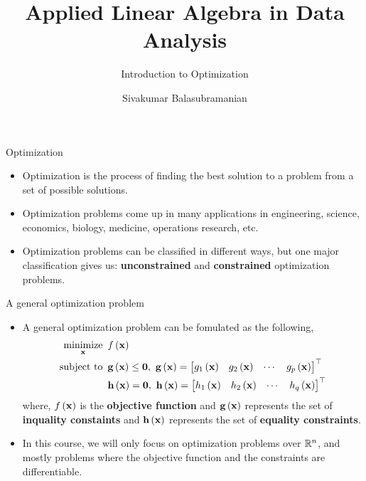 \documentclass[aspectratio=169]{beamer}
\title{Applied Linear Algebra in Data Analysis}
\subtitle{Introduction to Optimization}
\author{Sivakumar Balasubramanian}
\institute[Christian Medical College] %
{
  \inst{}%
  Department of Bioengineering\\
  Christian Medical College, Bagayam\\
  Vellore 632002
}
\date{}
\let\olditem\item
\renewcommand{\item}{\setlength{\itemsep}{\fill}\olditem}
\def\mf{\ensuremath\mathbf}
\def\mb{\ensuremath\mathbb}
\def\lp{\ensuremath\left(}
\def\rp{\ensuremath\right)}
\def\bmx{\ensuremath\begin{bmatrix*}[r]}
\def\emx{\ensuremath\end{bmatrix*}}
\def\R{\ensuremath\mb{R}}
\newcommand{\ct}[1]{\lp #1\rp}
\begin{document}


\begin{frame}
  \titlepage
\end{frame}


\begin{frame}[t]{Optimization}
\begin{itemize}
  \item Optimization is the process of finding the best solution to a problem from a set of possible solutions.
  \item Optimization problems come up in many applications in engineering, science, economics, biology, medicine, operations research, etc.
  \item Optimization problems can be classified in different ways, but one major classification gives us: \textbf{unconstrained} and \textbf{constrained} optimization problems.
\end{itemize}
\end{frame}


\begin{frame}[t]{A general optimization problem}
\begin{itemize}
  \item A general optimization problem can be fomulated as the following,
  \[ \begin{split}
      \underset{\mf{x}}{\text{minimize}} 
      & \,\,\, f\ct{\mf{x}} \\
      \mathrm{subject \,\, to} & \,\,\, \mf{g}\ct{\mf{x}} \leq \mf{0}, \,\, \mf{g}\ct{\mf{x}} = \bmx g_1\ct{\mf{x}} & g_2\ct{\mf{x}} & \cdots & g_p\ct{\mf{x}}\emx^\top \\
      & \,\,\, \mf{h}\ct{\mf{x}} = \mf{0}, \,\, \mf{h}\ct{\mf{x}} = \bmx h_1\ct{\mf{x}} & h_2\ct{\mf{x}} & \cdots & h_q\ct{\mf{x}}\emx^\top \\
  \end{split} \]
  where, $f\ct{\mf{x}}$ is the \textbf{objective function} and $\mf{g}\ct{\mf{x}}$ represents the set of \textbf{inquality constaints} and $\mf{h}\ct{\mf{x}}$ represents the set of \textbf{equality constraints}.

  \item In this course, we will only focus on optimization problems over $\R^n$, and mostly problems where the objective function and the constraints are differentiable.
\end{itemize}
\end{frame}
\end{document}
